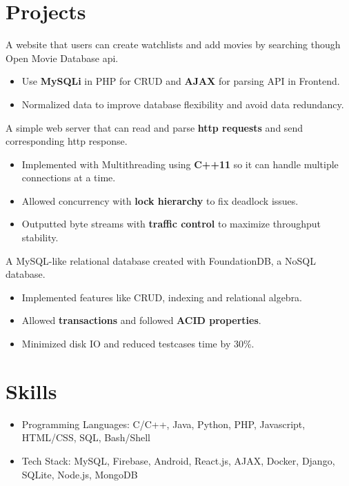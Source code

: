 \documentclass{resume}
\begin{document}
\section{Projects}
 {}
  A website that users can create watchlists and add movies by searching though Open Movie Database api.
\begin{itemize}
  \item Use \textbf{MySQLi} in PHP for CRUD and \textbf{AJAX} for parsing API in Frontend.
  \item Normalized data to improve database flexibility and avoid data redundancy.
\end{itemize}

 {}
  A simple web server that can read and parse \textbf{http requests} and send corresponding http response.
\begin{itemize}
  \item Implemented with Multithreading using \textbf{C++11} so it can handle multiple connections at a time.
  \item Allowed concurrency with \textbf{lock hierarchy} to fix deadlock issues.
  \item Outputted byte streams with \textbf{traffic control} to maximize throughput stability.
\end{itemize}

 {}
  A MySQL-like relational database created with FoundationDB, a NoSQL database.
\begin{itemize}
  \item Implemented features like CRUD, indexing and relational algebra.
  \item Allowed \textbf{transactions} and followed \textbf{ACID properties}.
  \item Minimized disk IO and reduced testcases time by 30\%.
\end{itemize}

\section{Skills}
\begin{itemize}[parsep=0.5ex]
  \item Programming Languages: C/C++, Java, Python, PHP, Javascript, HTML/CSS, SQL, Bash/Shell
  \item Tech Stack: MySQL, Firebase, Android, React.js, AJAX, Docker, Django, SQLite, Node.js, MongoDB
\end{itemize}
\end{document}
